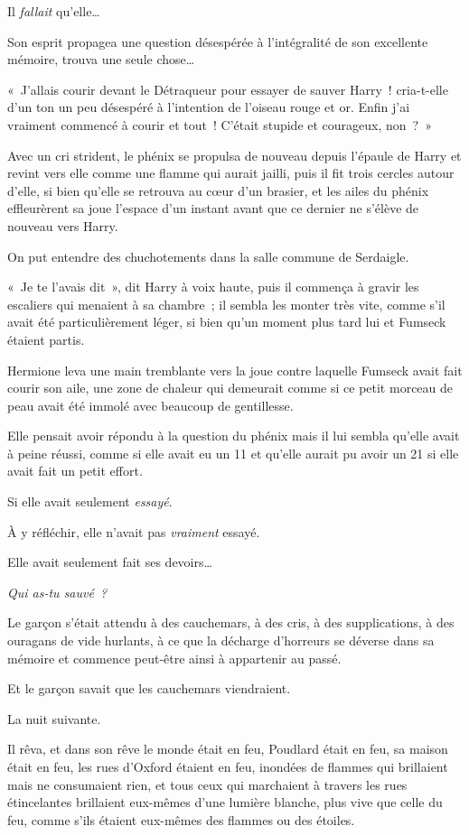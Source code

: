 Il \emph{fallait} qu'elle…

Son esprit propagea une question désespérée à l'intégralité de son excellente mémoire, trouva une seule chose…

«~J'allais courir devant le Détraqueur pour essayer de sauver Harry~! cria-t-elle d'un ton un peu désespéré à l'intention de l'oiseau rouge et or.
Enfin j'ai vraiment commencé à courir et tout~!
C'était stupide et courageux, non~?~»

Avec un cri strident, le phénix se propulsa de nouveau depuis l'épaule de Harry et revint vers elle comme une flamme qui aurait jailli, puis il fit trois cercles autour d'elle, si bien qu'elle se retrouva au cœur d'un brasier, et les ailes du phénix effleurèrent sa joue l'espace d'un instant avant que ce dernier ne s'élève de nouveau vers Harry.

On put entendre des chuchotements dans la salle commune de Serdaigle.

«~Je te l'avais dit~», dit Harry à voix haute, puis il commença à gravir les escaliers qui menaient à sa chambre~; il sembla les monter très vite, comme s'il avait été particulièrement léger, si bien qu'un moment plus tard lui et Fumseck étaient partis.

Hermione leva une main tremblante vers la joue contre laquelle Fumseck avait fait courir son aile, une zone de chaleur qui demeurait comme si ce petit morceau de peau avait été immolé avec beaucoup de gentillesse.

Elle pensait avoir répondu à la question du phénix mais il lui sembla qu'elle avait à peine réussi, comme si elle avait eu un 11 et qu'elle aurait pu avoir un 21 si elle avait fait un petit effort.

Si elle avait seulement \emph{essayé}.

À y réfléchir, elle n'avait pas \emph{vraiment} essayé.

Elle avait seulement fait ses devoirs…

\emph{Qui as-tu sauvé~?}


Le garçon s'était attendu à des cauchemars, à des cris, à des supplications, à des ouragans de vide hurlants, à ce que la décharge d'horreurs se déverse dans sa mémoire et commence peut-être ainsi à appartenir au passé.

Et le garçon savait que les cauchemars viendraient.

La nuit suivante.

Il rêva, et dans son rêve le monde était en feu, Poudlard était en feu, sa maison était en feu, les rues d'Oxford étaient en feu, inondées de flammes qui brillaient mais ne consumaient rien, et tous ceux qui marchaient à travers les rues étincelantes brillaient eux-mêmes d'une lumière blanche, plus vive que celle du feu, comme s'ils étaient eux-mêmes des flammes ou des étoiles.

